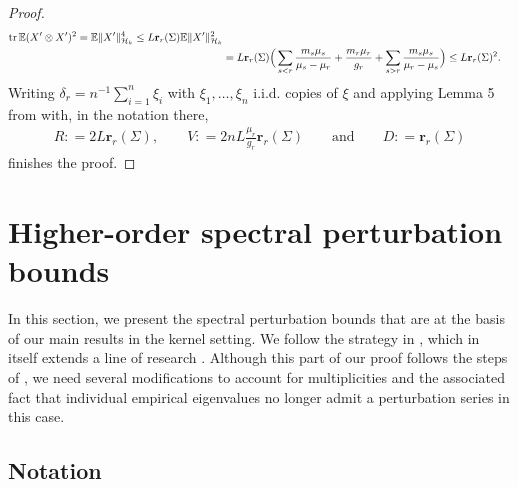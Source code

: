 \documentclass[a4paper,11pt]{article} %
\numberwithin{equation}{section}
\DeclareMathOperator*{\tr}{tr}
\theoremstyle{definition}
\theoremstyle{remark}
\theoremstyle{plain}
\begin{document}
\begin{proof}
\begin{align}
          \tr \mathbb{E} ( X' \otimes X' )^{2} 
    = 
          \mathbb{E}\| X' \|_{\mathcal{H}_k}^{4}\notag
    \le 
          L \mathbf{r}_{r}(\Sigma) \mathbb{E}\| X' \|_{\mathcal{H}_k}^{2}\\
    & =
          L \mathbf{r}_{r}(\Sigma)
          \Big( 
                \sum_{s < r}
                \frac{ m_{ s } \mu_{s} }{ \mu_{s} - \mu_{r} }
              + 
                \frac{ m_{r} \mu_{r} }{ g_{r} }
              +
                \sum_{s > r} 
                \frac{ m_{ s } \mu_{s} }{ \mu_{r} - \mu_{s} }
          \Big)
    \le 
          L \mathbf{r}_{r}(\Sigma)^{2}.
  \notag
  \end{align}
  Writing \( \delta_{r} = n^{-1} \sum_{ i = 1 }^{ n } \xi_{ i } \) with \( \xi_{1}, \dots, \xi_n \)
  i.i.d. copies of \( \xi \) and applying Lemma 5 from \cite{MR3629418} with, in the notation there,
  \begin{align}
    R: = 2 L \mathbf{ r }_{ r }( \Sigma ), 
    \qquad 
    V: = 2 n L \frac{\mu_{r}}{g_{r}} \mathbf{r}_{r}(\Sigma)
    \qquad \text{and} \qquad 
    D: = \mathbf{r}_{r}( \Sigma ) 
  \end{align}
  finishes the proof.
\end{proof}


\section{Higher-order spectral perturbation bounds}%
\label{sec_HigherOrderSpectralPerturbationBounds}

In this section, we present the spectral perturbation bounds that are at the basis of our main results in the kernel setting. We follow the strategy in \cite{Wahl2026PertubationExpansionsI}, which in itself extends a line of research \cite{MR3300524,MR3573302,MR4102689,JirakWahl2018PerturbationBoundsUnderRelativeGap,JirakWahl2023RelativePerturbationBounds}. 
Although this part of our proof follows the steps of \cite{Wahl2026PertubationExpansionsI}, we need several modifications to account for multiplicities and the associated fact that individual empirical eigenvalues no longer admit a perturbation series in this case. 

\subsection{Notation}%
\label{ssec_Notation}
\end{document}
